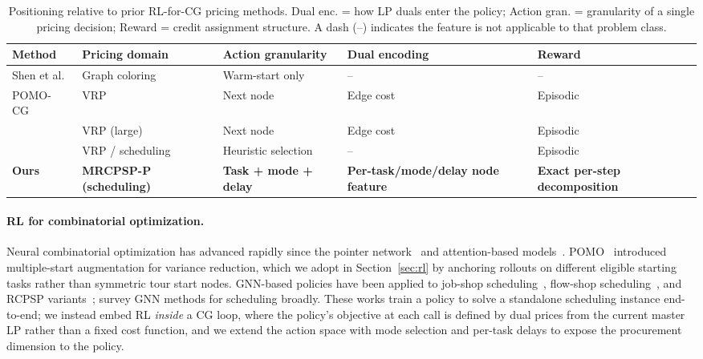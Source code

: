 \documentclass[11pt]{article}
\begin{document}
\begin{table}[t]
\centering
\caption{Positioning relative to prior RL-for-CG pricing methods. Dual enc. = how LP duals enter the policy; Action gran. = granularity of a single pricing decision; Reward = credit assignment structure. A dash (--) indicates the feature is not applicable to that problem class.}
\label{tab:cg-compare}
\small
\begin{tabular}{@{}lllll@{}}
\toprule
Method & Pricing domain & Action granularity & Dual encoding & Reward \\
\midrule
Shen et al.~\citep{shen2022enhancing} & Graph coloring & Warm-start only & -- & -- \\
POMO-CG~\citep{pomocg2024} & VRP & Next node & Edge cost & Episodic \\
\citet{hoornaert2025vrp} & VRP (large) & Next node & Edge cost & Episodic \\
\citet{rlhh2025cg} & VRP / scheduling & Heuristic selection & -- & Episodic \\
\midrule
\textbf{Ours} & \textbf{MRCPSP-P (scheduling)} & \textbf{Task + mode + delay} & \textbf{Per-task/mode/delay node feature} & \textbf{Exact per-step decomposition} \\
\bottomrule
\end{tabular}
\end{table}

\paragraph{RL for combinatorial optimization.}
Neural combinatorial optimization has advanced rapidly since the pointer network~\citep{vinyals2015pointer} and attention-based models~\citep{kool2019attention}.
POMO~\citep{kwon2020pomo} introduced multiple-start augmentation for variance reduction, which we adopt in Section~\ref{sec:rl} by anchoring rollouts on different eligible starting tasks rather than symmetric tour start nodes.
GNN-based policies have been applied to job-shop scheduling~\citep{zhang2020learning}, flow-shop scheduling~\citep{pan2021deep}, and RCPSP variants~\citep{chalumeau2024combinatorial}; \citet{gnnjssp2024survey} survey GNN methods for scheduling broadly.
These works train a policy to solve a standalone scheduling instance end-to-end; we instead embed RL \emph{inside} a CG loop, where the policy's objective at each call is defined by dual prices from the current master LP rather than a fixed cost function, and we extend the action space with mode selection and per-task delays to expose the procurement dimension to the policy.
\end{document}
